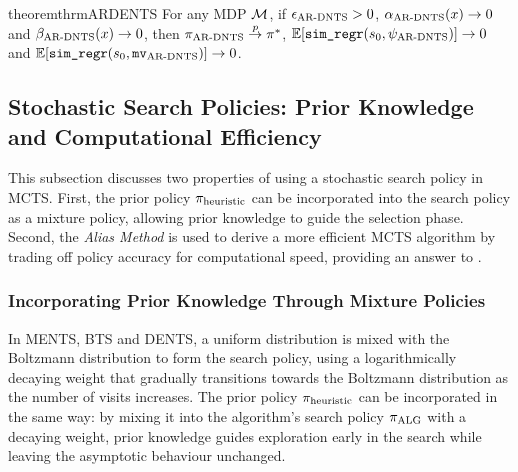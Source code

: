     \begin{restatable}{theorem}{thrmARDENTS} \label{thrm:4:ar_dents}
        For any MDP $\mathcal{M}$, if ${\epsilon_{{\textnormal{AR-DNTS}}}} > 0$, ${\alpha_{{\textnormal{AR-DNTS}}}}(x)\rightarrow 0$ and ${\beta_{{\textnormal{AR-DNTS}}}}(x)\rightarrow 0$, then ${\pi_{{\textnormal{AR-DNTS}}}}\overset{p}{\to} \pi^*$, $\mathbb{E}[{\textnormal{\texttt{sim\_regr}}}(s_0,{\psi_{{\textnormal{AR-DNTS}}}})]\rightarrow 0$ and  $\mathbb{E}[{\textnormal{\texttt{sim\_regr}}}(s_0,{\textup{\texttt{mv}}_{{\textnormal{AR-DNTS}}}})]\rightarrow 0$.
    \end{restatable} 











\subsection[Stochastic Search Policies]{Stochastic Search Policies: Prior Knowledge and Computational Efficiency}
\label{sec:4-2-3-stoch_search_policies}

    This subsection discusses two properties of using a stochastic search policy in MCTS. First, the prior policy ${\pi_{\textnormal{heuristic}}}$ can be incorporated into the search policy as a mixture policy, allowing prior knowledge to guide the selection phase. Second, the \textit{Alias Method} \cite{alias_method_one,alias_method_two} is used to derive a more efficient MCTS algorithm by trading off policy accuracy for computational speed, providing an answer to \complexityq.
        


        






\subsubsection{Incorporating Prior Knowledge Through Mixture Policies}
\label{sec:4-2-3-1-mixture_policies}

    \newcommand{\pimix}{{\pi_{\text{mix}}}}

    In MENTS, BTS and DENTS, a uniform distribution is mixed with the Boltzmann distribution to form the search policy, using a logarithmically decaying weight that gradually transitions towards the Boltzmann distribution as the number of visits increases. The prior policy ${\pi_{\textnormal{heuristic}}}$ can be incorporated in the same way: by mixing it into the algorithm's search policy ${\pi_{{\textnormal{ALG}}}}$ with a decaying weight, prior knowledge guides exploration early in the search while leaving the asymptotic behaviour unchanged.

